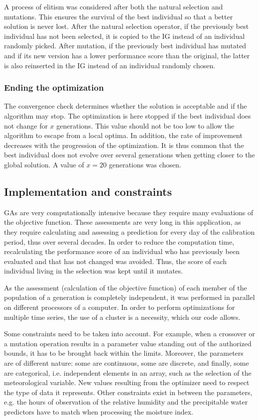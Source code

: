 \documentclass{ametsoc}
\begin{document}
A process of elitism was considered after both the natural selection and mutations. This ensures the survival of the best individual so that a better solution is never lost. After the natural selection operator, if the previously best individual has not been selected, it is copied to the IG instead of an individual randomly picked. After mutation, if the previously best individual has mutated and if its new version has a lower performance score than the original, the latter is also reinserted in the IG instead of an individual randomly chosen.


\subsubsection{Ending the optimization}

The convergence check determines whether the solution is acceptable and if the algorithm may stop. The optimization is here stopped if the best individual does not change for $x$ generations. This value should not be too low to allow the algorithm to escape from a local optima. In addition, the rate of improvement decreases with the progression of the optimization. It is thus common that the best individual does not evolve over several generations when getting closer to the global solution. A value of $x=20$ generations was chosen.


\subsection{Implementation and constraints}

GAs are very computationally intensive because they require many evaluations of the objective function. These assessments are very long in this application, as they require calculating and assessing a prediction for every day of the calibration period, thus over several decades. In order to reduce the computation time, recalculating the performance score of an individual who has previously been evaluated and that has not changed was avoided. Thus, the score of each individual living in the selection was kept until it mutates.

As the assessment (calculation of the objective function) of each member of the population of a generation is completely independent, it was performed in parallel on different processors of a computer. In order to perform optimizations for multiple time series, the use of a cluster is a necessity, which our code allows.

Some constraints need to be taken into account. For example, when a crossover or a mutation operation results in a parameter value standing out of the authorized bounds, it has to be brought back within the limits. Moreover, the parameters are of different nature: some are continuous, some are discrete, and finally, some are categorical, i.e. independent elements in an array, such as the selection of the meteorological variable. New values resulting from the optimizer need to respect the type of data it represents. Other constraints exist in between the parameters, e.g. the hours of observation of the relative humidity and the precipitable water predictors have to match when processing the moisture index.
\end{document}
